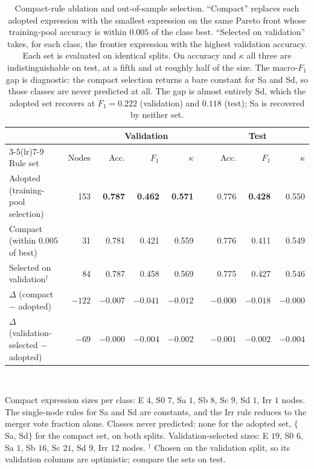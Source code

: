 \documentclass[11pt]{article}
\newcommand{\kappastat}{\ensuremath{\kappa}}
\begin{document}
\begin{table}[htbp]
\centering
\caption{Compact-rule ablation and out-of-sample selection. ``Compact''
replaces each adopted expression with the smallest expression on the same
Pareto front whose training-pool accuracy is within $0.005$ of the class best.
``Selected on validation'' takes, for each class, the frontier expression with
the highest validation accuracy. Each set is evaluated on identical splits. On
accuracy and $\kappa$ all three are indistinguishable on test, at a fifth and at
roughly half of the size. The macro-$F_1$ gap is
diagnostic: the compact selection returns a bare constant for Sa and Sd, so
those classes are never predicted at all. The gap is almost entirely Sd, which
the adopted set recovers at $F_1 = 0.222$ (validation) and $0.118$ (test); Sa
is recovered by neither set.}
\label{tab:compact}
\small
\setlength{\tabcolsep}{5pt}
\begin{tabular}{lrrrrcrrr}
\toprule
& & \multicolumn{3}{c}{Validation} & & \multicolumn{3}{c}{Test} \\
\cmidrule(lr){3-5}\cmidrule(lr){7-9}
Rule set & Nodes & Acc. & $F_1$ & \kappastat & & Acc. & $F_1$ & \kappastat \\
\midrule
Adopted (training-pool selection) & 153 & \textbf{0.787} & \textbf{0.462} & \textbf{0.571} & & 0.776 & \textbf{0.428} & 0.550 \\
Compact (within $0.005$ of best) &  31 & 0.781 & 0.421 & 0.559 & & 0.776 & 0.411 & 0.549 \\
Selected on validation$^{\dagger}$ & 84 & 0.787 & 0.458 & 0.569 & & 0.775 & 0.427 & 0.546 \\
\midrule
$\Delta$ (compact $-$ adopted) & $-122$ & $-0.007$ & $-0.041$ & $-0.012$ & & $-0.000$ & $-0.018$ & $-0.000$ \\
$\Delta$ (validation-selected $-$ adopted) & $-69$ & $-0.000$ & $-0.004$ & $-0.002$ & & $-0.001$ & $-0.002$ & $-0.004$ \\
\bottomrule
\end{tabular}
\\[3pt]
\parbox{\columnwidth}{\footnotesize Compact expression sizes per class:
E $4$, S0 $7$, Sa $1$, Sb $8$, Sc $9$, Sd $1$, Irr $1$ nodes. The single-node
rules for Sa and Sd are constants, and the Irr rule reduces to the merger vote
fraction alone. Classes never predicted: none for the adopted set,
$\{$Sa, Sd$\}$ for the compact set, on both splits. Validation-selected sizes:
E $19$, S0 $6$, Sa $1$, Sb $16$, Sc $21$, Sd $9$, Irr $12$ nodes. $^{\dagger}$ Chosen on
the validation split, so its validation columns are optimistic; compare the sets
on test.}
\end{table}
\end{document}
